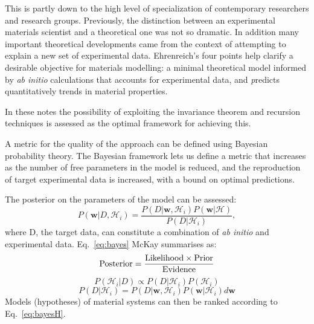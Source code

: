 This is partly down to the high level of specialization of contemporary 
researchers and research groups. Previously, the distinction between
an experimental materials scientist and a theoretical one was not so dramatic. 
In addition many important theoretical developments came 
from the context of attempting to explain a new set of experimental data.
Ehrenreich's four points help clarify a desirable objective for materials modelling:
a minimal theoretical model informed by {\it ab initio} calculations that accounts for 
experimental data, and {\emph predicts} quantitatively trends in material properties. 

In these notes the possibility of exploiting the invariance theorem 
and recursion techniques is assessed as the optimal framework
for achieving this. 

A metric for the quality of the approach can be defined using 
Bayesian probability theory. The Bayesian framework lets us define a metric 
that increases as the number of free parameters in the model is reduced,
and the reproduction of target experimental data is increased, 
with a bound on optimal predictions.

The posterior on the parameters of the model can be assessed:
%
\begin{equation}
\label{eq:bayes}
P(\mathbf{w}|D, \mathcal{H}_{i}) = 
\frac{P(D|\mathbf{w}, \mathcal{H}_{i})P(\mathbf{w}|\mathcal{H})}{P(D|\mathcal{H}_{i})},
\end{equation}
%
where D, the target data, can constitute a combination of {\it ab initio} and experimental data. 
Eq.~\ref{eq:bayes} McKay summarises as:
%
\begin{equation}
{\rm Posterior} = \frac{{\rm Likelihood} \times {\rm Prior}}{{\rm Evidence}}
\end{equation}
%
\begin{equation}
\label{eq:bayesH}
P(\mathcal{H}_{i}|D) \propto P(D|\mathcal{H}_{i})P(\mathcal{H}_{i})
\end{equation}
%
\begin{equation}
\label{eq:bayesH}
P(D|\mathcal{H}_{i}) = P(D|\mathbf{w}, \mathcal{H}_{i})P(\mathbf{w}|\mathcal{H}_{i})d\mathbf{w}
\end{equation}
%
Models (hypotheses) of material systems can then be ranked according to Eq.~\ref{eq:bayesH}.

